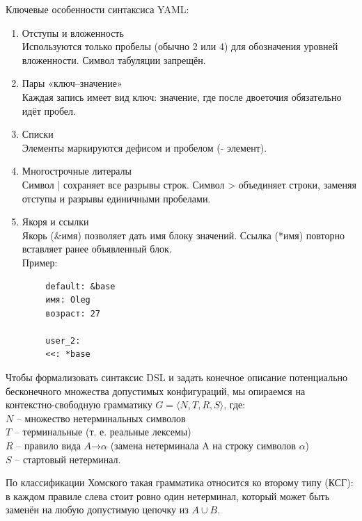 Ключевые особенности синтаксиса YAML:
\begin{enumerate}[1.]
      \item Отступы и вложенность\\
            Используются только пробелы (обычно 2 или 4) для обозначения уровней вложенности. Символ табуляции запрещён.
      \item Пары «ключ–значение»\\
            Каждая запись имеет вид ключ: значение, где после двоеточия обязательно идёт пробел.
      \item Списки\\
            Элементы маркируются дефисом и пробелом (- элемент).
      \item Многострочные литералы\\
            Символ | сохраняет все разрывы строк. Символ > объединяет строки, заменяя отступы и разрывы единичными пробелами.
      \item Якоря и ссылки\\
            Якорь (\&имя) позволяет дать имя блоку значений. Ссылка (*имя) повторно вставляет ранее объявленный блок.\\
            Пример:
\end{enumerate}

\begin{verbatim}
        default: &base
        имя: Oleg
        возраст: 27

        user_2:
        <<: *base
\end{verbatim}
Чтобы формализовать синтаксис DSL и задать конечное описание потенциально
бесконечного множества допустимых конфигураций,
мы опираемся на контекстно-свободную грамматику $G=\langle N,T,R,S\rangle$, где:\\
$N$ – множество нетерминальных символов \\
$T$ – терминальные (т. е. реальные лексемы) \\
$R$ – правило вида $A$→$\alpha$ (замена нетерминала A на строку символов $\alpha$) \\
$S$ – стартовый нетерминал.

По классификации Хомского такая грамматика относится ко второму типу (КСГ): в каждом правиле слева стоит ровно один нетерминал, который может быть заменён на любую допустимую цепочку из  $A\cup B$.

